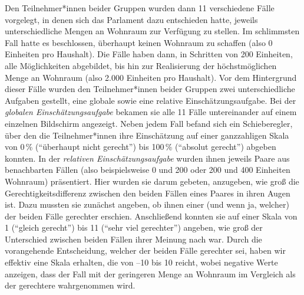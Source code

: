 \documentclass[justified,nobib,nohyper,symmetric,twoside]{tufte-book}
\begin{document}
Den Teilnehmer*innen beider Gruppen wurden dann 11 verschiedene Fälle vorgelegt, in denen sich das Parlament dazu entschieden hatte, jeweils unterschiedliche Mengen an Wohnraum zur Verfügung zu stellen.
Im schlimmsten Fall hatte es beschlossen, überhaupt keinen Wohnraum zu schaffen (also 0 Einheiten pro Haushalt).
Die Fälle haben dann, in Schritten von 200 Einheiten, alle Möglichkeiten abgebildet, bis hin zur Realisierung der höchstmöglichen Menge an Wohnraum (also 2.000 Einheiten pro Haushalt).
Vor dem Hintergrund dieser Fälle wurden den Teilnehmer*innen beider Gruppen zwei unterschiedliche Aufgaben gestellt, eine globale sowie eine relative Einschätzungsaufgabe.
Bei der \textit{globalen Einschätzungsaufgabe} bekamen sie alle 11 Fälle untereinander auf einem einzelnen Bildschirm angezeigt.
Neben jedem Fall befand sich ein Schieberegler, über den die Teilnehmer*innen ihre Einschätzung auf einer ganzzahligen Skala von 0\,\% (\enquote{überhaupt nicht gerecht}) bis 100\,\% (\enquote{absolut gerecht}) abgeben konnten.
In der \textit{relativen Einschätzungsaufgabe} wurden ihnen jeweils Paare aus benachbarten Fällen (also beispielsweise 0 und 200 oder 200 und 400 Einheiten Wohnraum) präsentiert.
Hier wurden sie darum gebeten, anzugeben, wie groß die Gerechtigkeitsdifferenz zwischen den beiden Fällen eines Paares in ihren Augen ist.
Dazu mussten sie zunächst angeben, ob ihnen einer (und wenn ja, welcher) der beiden Fälle gerechter erschien.
Anschließend konnten sie auf einer Skala von 1 (\enquote{gleich gerecht}) bis 11 (\enquote{sehr viel gerechter}) angeben, wie groß der Unterschied zwischen beiden Fällen ihrer Meinung nach war.
Durch die vorangehende Entscheidung, welcher der beiden Fälle gerechter sei, haben wir effektiv eine Skala erhalten, die von --10 bis 10 reicht, wobei negative Werte anzeigen, dass der Fall mit der geringeren Menge an Wohnraum im Vergleich als der gerechtere wahrgenommen wird.
\end{document}
